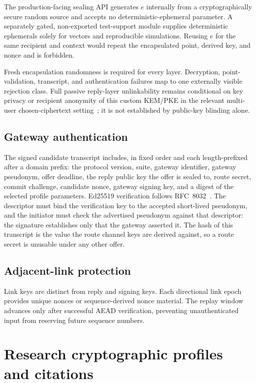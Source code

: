 \documentclass[11pt,oneside]{article}
\begin{document}
The production-facing sealing API generates $e$ internally from a cryptographically secure random source and accepts no deterministic-ephemeral parameter. A separately gated, non-exported test-support module supplies deterministic ephemerals solely for vectors and reproducible simulations. Reusing $e$ for the same recipient and context would repeat the encapsulated point, derived key, and nonce and is forbidden.

Fresh encapsulation randomness is required for every layer. Decryption, point-validation, transcript, and authentication failures map to one externally visible rejection class. Full passive reply-layer unlinkability remains conditional on key privacy or recipient anonymity of this custom KEM/PKE in the relevant multi-user chosen-ciphertext setting~\cite{keyprivacy2001}; it is not established by public-key blinding alone.

\subsection{Gateway authentication}

The signed candidate transcript includes, in fixed order and each length-prefixed after a domain prefix: the protocol version, suite, gateway identifier, gateway pseudonym, offer deadline, the reply public key the offer is sealed to, route secret, commit challenge, candidate nonce, gateway signing key, and a digest of the selected profile parameters. Ed25519 verification follows RFC~8032~\cite{eddsa}. The descriptor must bind the verification key to the accepted short-lived pseudonym, and the initiator must check the advertised pseudonym against that descriptor: the signature establishes only that the gateway asserted it. The hash of this transcript is the value the route channel keys are derived against, so a route secret is unusable under any other offer.

\subsection{Adjacent-link protection}

Link keys are distinct from reply and signing keys. Each directional link epoch provides unique nonces or sequence-derived nonce material. The replay window advances only after successful AEAD verification, preventing unauthenticated input from reserving future sequence numbers.

\section{Research cryptographic profiles and citations}
\label{sec:researchcrypto}
\end{document}
